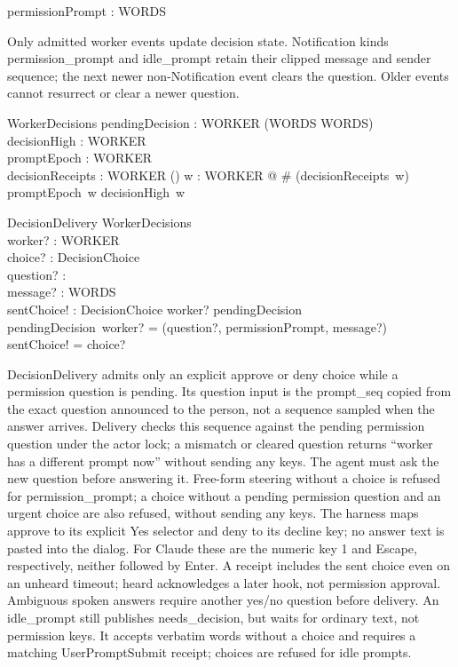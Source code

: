 \documentclass[a4paper,10pt,fleqn]{article}
\begin{document}
\begin{axdef}
  permissionPrompt : WORDS
\end{axdef}

Only admitted worker events update decision state. Notification kinds
permission\_prompt and idle\_prompt retain their clipped message and sender
sequence; the next newer non-Notification event clears the question. Older
events cannot resurrect or clear a newer question.

\begin{schema}{WorkerDecisions}
  pendingDecision : WORKER \pfun (\nat \cross WORDS \cross WORDS) \\
  decisionHigh : WORKER \fun \nat \\
  promptEpoch : WORKER \fun \nat \\
  decisionReceipts : WORKER \fun \power (\nat \cross \nat)
\where
  \forall w : WORKER @ \# (decisionReceipts~w)  \land
    promptEpoch~w \leq decisionHigh~w
\end{schema}

\begin{schema}{DecisionDelivery}
  \Xi WorkerDecisions \\
  worker? : WORKER \\
  choice? : DecisionChoice \\
  question? : \nat \\
  message? : WORDS \\
  sentChoice! : DecisionChoice
\where
  worker? \in \dom pendingDecision \\
  pendingDecision~worker? = (question?, permissionPrompt, message?) \\
  sentChoice! = choice?
\end{schema}

DecisionDelivery admits only an explicit approve or deny choice while a
permission question is pending. Its question input is the prompt\_seq copied
from the exact question announced to the person, not a sequence sampled when
the answer arrives. Delivery checks this sequence against the pending permission
question under the actor lock; a mismatch or cleared question returns ``worker
has a different prompt now'' without sending any keys. The agent must ask the
new question before answering it. Free-form steering without a choice is refused
for permission\_prompt; a choice without a pending permission question and an urgent choice are also
refused, without sending any keys. The harness maps approve to its explicit
Yes selector and deny to its decline key; no answer text is pasted into the
dialog. For Claude these are the numeric key 1 and Escape, respectively,
neither followed by Enter. A receipt includes the sent choice even on an
unheard timeout; heard acknowledges a later hook, not permission approval.
Ambiguous spoken answers require another yes/no question before delivery.
An idle\_prompt still publishes needs\_decision, but waits for ordinary text,
not permission keys. It accepts verbatim words without a choice and requires
a matching UserPromptSubmit receipt; choices are refused for idle prompts.
\end{document}

